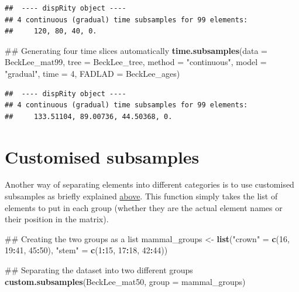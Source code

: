 \documentclass[]{book}
\newenvironment{Shaded}{\begin{snugshade}}{\end{snugshade}}
\newcommand{\KeywordTok}[1]{\textcolor[rgb]{0.13,0.29,0.53}{\textbf{#1}}}
\newcommand{\DataTypeTok}[1]{\textcolor[rgb]{0.13,0.29,0.53}{#1}}
\newcommand{\DecValTok}[1]{\textcolor[rgb]{0.00,0.00,0.81}{#1}}
\newcommand{\StringTok}[1]{\textcolor[rgb]{0.31,0.60,0.02}{#1}}
\newcommand{\OperatorTok}[1]{\textcolor[rgb]{0.81,0.36,0.00}{\textbf{#1}}}
\newcommand{\NormalTok}[1]{#1}
\theoremstyle{definition}
\theoremstyle{definition}
\theoremstyle{remark}
\begin{document}
\begin{verbatim}
##  ---- dispRity object ---- 
## 4 continuous (gradual) time subsamples for 99 elements:
##     120, 80, 40, 0.
\end{verbatim}

\begin{Shaded}
\begin{Highlighting}[]
\NormalTok{## Generating four time slices automatically}
\KeywordTok{time.subsamples}\NormalTok{(}\DataTypeTok{data =}\NormalTok{ BeckLee_mat99, }\DataTypeTok{tree =}\NormalTok{ BeckLee_tree,}
    \DataTypeTok{method =} \StringTok{"continuous"}\NormalTok{, }\DataTypeTok{model =} \StringTok{"gradual"}\NormalTok{, }\DataTypeTok{time =} \DecValTok{4}\NormalTok{, }\DataTypeTok{FADLAD =}\NormalTok{ BeckLee_ages)}
\end{Highlighting}
\end{Shaded}

\begin{verbatim}
##  ---- dispRity object ---- 
## 4 continuous (gradual) time subsamples for 99 elements:
##     133.51104, 89.00736, 44.50368, 0.
\end{verbatim}

\hypertarget{customised-subsamples}{\section{Customised
subsamples}\label{customised-subsamples}}

Another way of separating elements into different categories is to use
customised subsamples as briefly explained
\protect\hyperlink{disparity-among-groups}{above}. This function simply
takes the list of elements to put in each group (whether they are the
actual element names or their position in the matrix).

\begin{Shaded}
\begin{Highlighting}[]
\NormalTok{## Creating the two groups as a list}
\NormalTok{mammal_groups <-}\StringTok{ }\KeywordTok{list}\NormalTok{(}\StringTok{"crown"}\NormalTok{ =}\StringTok{ }\KeywordTok{c}\NormalTok{(}\DecValTok{16}\NormalTok{, }\DecValTok{19}\OperatorTok{:}\DecValTok{41}\NormalTok{, }\DecValTok{45}\OperatorTok{:}\DecValTok{50}\NormalTok{),}
                      \StringTok{"stem"}\NormalTok{ =}\StringTok{ }\KeywordTok{c}\NormalTok{(}\DecValTok{1}\OperatorTok{:}\DecValTok{15}\NormalTok{, }\DecValTok{17}\OperatorTok{:}\DecValTok{18}\NormalTok{, }\DecValTok{42}\OperatorTok{:}\DecValTok{44}\NormalTok{))}

\NormalTok{## Separating the dataset into two different groups}
\KeywordTok{custom.subsamples}\NormalTok{(BeckLee_mat50, }\DataTypeTok{group =}\NormalTok{ mammal_groups)}
\end{Highlighting}
\end{Shaded}
\end{document}
